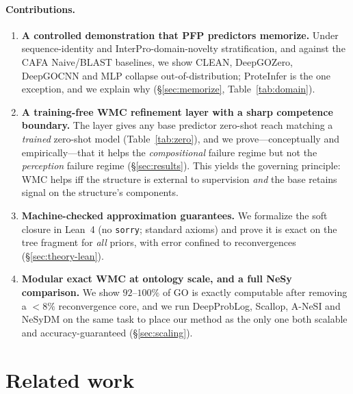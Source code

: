 \documentclass[11pt]{article}
\begin{document}
\paragraph{Contributions.}
\begin{enumerate}\itemsep1pt
\item \textbf{A controlled demonstration that PFP predictors memorize.} Under
sequence-identity and InterPro-domain-novelty stratification, and against the CAFA Naive/BLAST
baselines, we show CLEAN, DeepGOZero, DeepGOCNN and MLP collapse out-of-distribution; ProteInfer
is the one exception, and we explain why (\S\ref{sec:memorize}, Table~\ref{tab:domain}).
\item \textbf{A training-free WMC refinement layer with a sharp competence boundary.} The layer
gives any base predictor zero-shot reach matching a \emph{trained} zero-shot model
(Table~\ref{tab:zero}), and we prove---conceptually and empirically---that it helps the
\emph{compositional} failure regime but not the \emph{perception} failure regime
(\S\ref{sec:results}). This yields the governing principle: WMC helps iff the structure is
external to supervision \emph{and} the base retains signal on the structure's components.
\item \textbf{Machine-checked approximation guarantees.} We formalize the soft closure in Lean~4
(no \texttt{sorry}; standard axioms) and prove it is exact on the tree fragment for \emph{all}
priors, with error confined to reconvergences (\S\ref{sec:theory-lean}).
\item \textbf{Modular exact WMC at ontology scale, and a full NeSy comparison.} We show $92$--$100\%$
of GO is exactly computable after removing a ${<}8\%$ reconvergence core, and we run DeepProbLog,
Scallop, A-NeSI and NeSyDM on the same task to place our method as the only one both scalable and
accuracy-guaranteed (\S\ref{sec:scaling}).
\end{enumerate}

\section{Related work}\label{sec:related}
\end{document}
